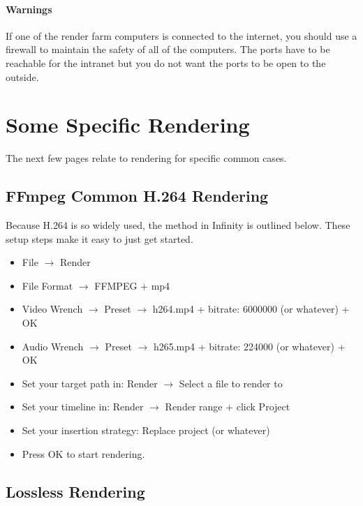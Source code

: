 \paragraph{Warnings}

If one of the render farm computers is connected to the internet,
you should use a firewall to maintain the safety of all of the
computers.  The ports have to be reachable for the intranet but you
do not want the ports to be open to the outside.

\section{Some Specific Rendering}%
\label{sec:some_specific_rendering}

\noindent The next few pages relate to rendering for specific common
cases.

\subsection{FFmpeg Common H.264 Rendering}%
\label{sub:ffmpeg_h264_rendering}

Because H.264 is so widely used, the method in \CGG{} Infinity is
outlined below.  These setup steps make it easy to just get started.

\begin{itemize}
\item File $\rightarrow$ Render
\item File Format $\rightarrow$ FFMPEG + mp4
\item Video Wrench $\rightarrow$ Preset $\rightarrow$ h264.mp4 +
  bitrate: 6000000 (or whatever) + OK
\item Audio Wrench $\rightarrow$ Preset $\rightarrow$ h265.mp4 +
  bitrate: 224000 (or whatever) + OK
\item Set your target path in: Render $\rightarrow$ Select a file to
  render to
\item Set your timeline in: Render $\rightarrow$ Render range +
  click Project
\item Set your insertion strategy: Replace project (or whatever)
\item Press OK to start rendering.
\end{itemize}

\subsection{Lossless Rendering}%
\label{sub:loseeless_rendering}

